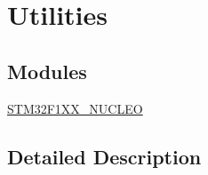 \hypertarget{group___utilities}{}\section{Utilities}
\label{group___utilities}
\subsection*{Modules}
\begin{DoxyCompactItemize}
\item 
\mbox{\hyperlink{group___s_t_m32_f1_x_x___n_u_c_l_e_o}{S\+T\+M32\+F1\+X\+X\+\_\+\+N\+U\+C\+L\+EO}}
\end{DoxyCompactItemize}


\subsection{Detailed Description}
